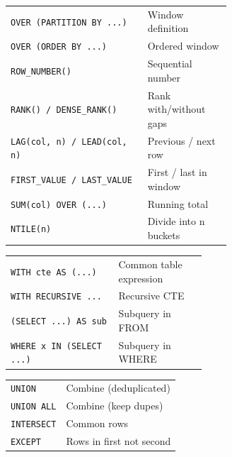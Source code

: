 \documentclass[10pt]{extarticle}
\begin{document}
\begin{multicols}{2}
\begin{tabularx}{\linewidth}{@{}>{\raggedright\arraybackslash}p{0.62\linewidth}@{\enspace}Y@{}}
\texttt{OVER (PARTITION BY ...)}    & Window definition \\
\texttt{OVER (ORDER BY ...)}        & Ordered window \\
\texttt{ROW\_NUMBER()}              & Sequential number \\
\texttt{RANK() / DENSE\_RANK()}     & Rank with/without gaps \\
\texttt{LAG(col, n) / LEAD(col, n)} & Previous / next row \\
\texttt{FIRST\_VALUE / LAST\_VALUE} & First / last in window \\
\texttt{SUM(col) OVER (...)}        & Running total \\
\texttt{NTILE(n)}                    & Divide into n buckets \\
\end{tabularx}

\begin{tabularx}{\linewidth}{@{}>{\raggedright\arraybackslash}p{0.55\linewidth}@{\enspace}Y@{}}
\texttt{WITH cte AS (...)}          & Common table expression \\
\texttt{WITH RECURSIVE ...}         & Recursive CTE \\
\texttt{(SELECT ...) AS sub}        & Subquery in FROM \\
\texttt{WHERE x IN (SELECT ...)}   & Subquery in WHERE \\
\end{tabularx}

\begin{tabularx}{\linewidth}{@{}l@{\enspace}Y@{}}
\texttt{UNION}                       & Combine (deduplicated) \\
\texttt{UNION ALL}                   & Combine (keep dupes) \\
\texttt{INTERSECT}                   & Common rows \\
\texttt{EXCEPT}                      & Rows in first not second \\
\end{tabularx}


\end{multicols}
\end{document}
